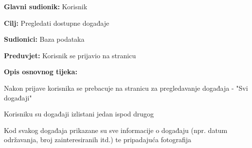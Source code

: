 				
					\noindent {}
					\begin{packed_item}
					\item \textbf{Glavni sudionik:} Korisnik
					\item  \textbf{Cilj:} Pregledati dostupne događaje
					\item  \textbf{Sudionici:} Baza podataka
					\item  \textbf{Preduvjet:} Korisnik se prijavio na stranicu
					\item  \textbf{Opis osnovnog tijeka:}
					
					\item[] \begin{packed_enum}
						
						\item Nakon prijave korisnika se prebacuje na stranicu za pregledavanje događaja - "Svi događaji"
						\item Korisniku su događaji izlistani jedan ispod drugog
						\item Kod svakog događaja prikazane su sve informacije o događaju (npr. datum održavanja, broj zainteresiranih itd.) te pripadajuća fotografija
					\end{packed_enum}
					
				\end{packed_item}
				
